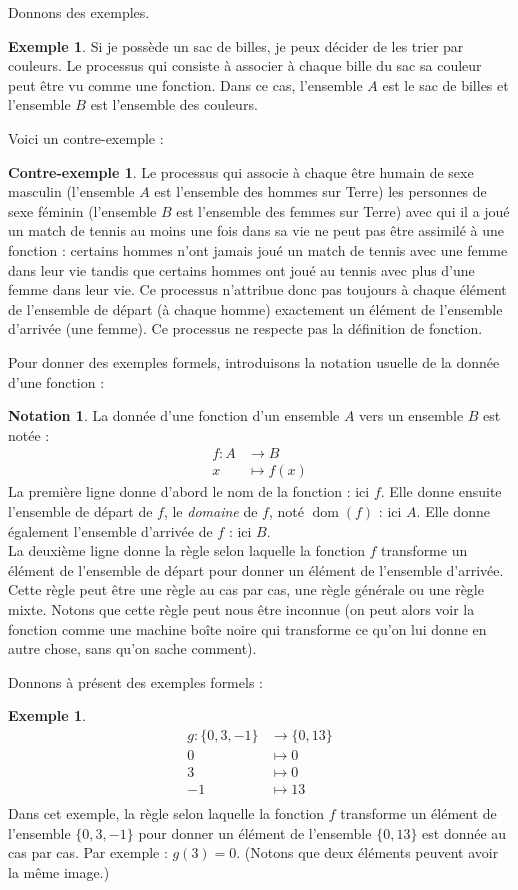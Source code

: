 \documentclass[a4paper,13pt]{scrreprt}
\theoremstyle{plain}
\theoremstyle{definition}
\newtheorem{exe}[subsection]{Exemple}
\newtheorem{con}[subsection]{Contre-exemple}
\newtheorem*{nota}{Notation}
\DeclareMathOperator{\dom}{dom}
\begin{document}
Donnons des exemples.
\begin{exe}
	Si je possède un sac de billes, je peux décider de les trier par couleurs. Le processus qui consiste à associer à chaque bille du sac sa couleur peut être vu comme une fonction. Dans ce cas, l'ensemble $A$ est le sac de billes et l'ensemble $B$ est l'ensemble des couleurs.
\end{exe}
Voici un contre-exemple :
\begin{con}
	Le processus qui associe à chaque être humain de sexe masculin (l'ensemble $A$ est l'ensemble des hommes sur Terre) les personnes de sexe féminin (l'ensemble $B$ est l'ensemble des femmes sur Terre) avec qui il a joué un match de tennis au moins une fois dans sa vie ne peut pas être assimilé à une fonction : certains hommes n'ont jamais joué un match de tennis avec une femme dans leur vie tandis que certains hommes ont joué au tennis avec plus d'une femme dans leur vie. Ce processus n'attribue donc pas toujours à chaque élément de l'ensemble de départ (à chaque homme) exactement un élément de l'ensemble d'arrivée (une femme). Ce processus ne respecte pas la définition de fonction.
\end{con}
Pour donner des exemples formels, introduisons la notation usuelle de la donnée d'une fonction :
\begin{nota}
	La donnée d'une fonction d'un ensemble $A$ vers un ensemble $B$ est notée :
	\begin{align*}
	f : A &\to B \\
	x &\mapsto f(x)
	\end{align*}
	La première ligne donne d'abord le nom de la fonction : ici $f$. Elle donne ensuite l'ensemble de départ de $f$, le \emph{domaine} de $f$, noté $\dom(f)$ : ici $A$. Elle donne également l'ensemble d'arrivée de $f$ : ici $B$. \\
	La deuxième ligne donne la règle selon laquelle la fonction $f$ transforme un élément de l'ensemble de départ pour donner un élément de l'ensemble d'arrivée. Cette règle peut être une règle au cas par cas, une règle générale ou une règle mixte. Notons que cette règle peut nous être inconnue (on peut alors voir la fonction comme une machine \og boîte noire \fg{} qui transforme ce qu'on lui donne en autre chose, sans qu'on sache comment).
\end{nota}
Donnons à présent des exemples formels :
\begin{exe}
	\begin{align*}
	g : \{0,3,-1\} &\to \{0,13\} \\
	0 &\mapsto 0 \\
	3 &\mapsto 0 \\
	-1 &\mapsto 13 \\
	\end{align*}
	Dans cet exemple, la règle selon laquelle la fonction $f$ transforme un élément de l'ensemble $\{0,3,-1\}$ pour donner un élément de l'ensemble $\{0,13\}$ est donnée au cas par cas. Par exemple : $g(3) = 0$. (Notons que deux éléments peuvent avoir la même image.)
\end{exe}
\end{document}
